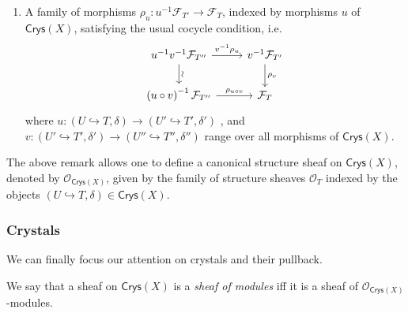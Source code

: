 \begin{rem}
\begin{enumerate}
		\item A family of morphisms $\rho_u\colon u^{-1}\mathcal{F}_{T'} \to \mathcal{F}_T$,
			indexed by morphisms 
			$u$ of $\mathsf{Crys}(X)$,
			satisfying the usual cocycle condition, i.e.
			\begin{equation*}
			\begin{tikzcd}
				u^{-1} v^{-1} \mathcal{F}_{T''} 
				\arrow[r, "v^{-1}\rho_u", rightarrow] 
				\arrow[d, "\rotatebox{90}{\(\sim\)}", rightarrow] &
				v^{-1} \mathcal{F}_{T'} 
				\arrow[d, "\rho_v", rightarrow] \\
				\left( u \circ v \right)^{-1} \mathcal{F}_{T''}
				\arrow[r, "\rho_{u \circ v}", rightarrow] &
				\mathcal{F}_T
			\end{tikzcd}
			\end{equation*}
			where $u\colon \left(U \hookrightarrow T, \delta\right) \to 
			\left(U' \hookrightarrow T', \delta'\right)$ ,
			and $v\colon \left(U' \hookrightarrow T', \delta'\right) \to 
			\left(U'' \hookrightarrow T'', \delta''\right)$
			range over all morphisms of $\mathsf{Crys}(X)$.
	\end{enumerate}
\end{rem}


\begin{ex}
	The above remark allows one to define a canonical structure sheaf
	on $\mathsf{Crys}(X)$, denoted by $\mathcal{O}_{\mathsf{Crys}(X)}$,
	given by the family of structure sheaves $\mathcal{O}_T$
	indexed by the objects 
	$\left(U \hookrightarrow T, \delta\right) \in \mathsf{Crys}(X)$.
\end{ex}



\subsubsection{Crystals}
We can finally focus our attention on crystals and their pullback.


\begin{defn}
	We say that a sheaf on $\mathsf{Crys}(X)$ is a {\em sheaf of modules}
	iff it is a sheaf of $\mathcal{O}_{\mathsf{Crys}(X)}$-modules.
\end{defn}


